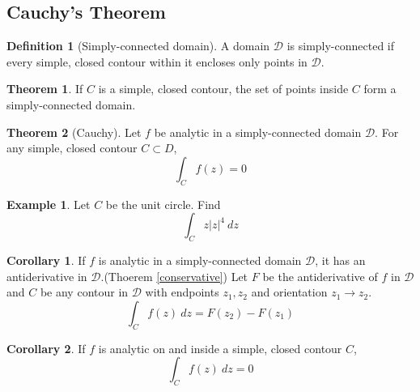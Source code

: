 \documentclass[10pt, a4paper]{extarticle}
\theoremstyle{definition}
\newtheorem{thm}{Theorem}
\newtheorem{cor}{Corollary}[thm]
\newtheorem{defn}{Definition}
\newtheorem{eg}{Example}
\begin{document}
\subsection{Cauchy's Theorem}
\begin{defn}[Simply-connected domain]
	A domain $\mathscr{D}$ is simply-connected if every simple, closed contour within it encloses only points in $\mathscr{D}$.
\end{defn}

\begin{thm}
	If $C$ is a simple, closed contour, the set of points inside $C$ form a simply-connected domain.
\end{thm}

\begin{thm}[Cauchy]
	Let $f$ be analytic in a simply-connected domain $\mathscr{D}$. For any simple, closed contour $C\subset D$,
	\[\int_Cf(z)=0\]
\end{thm}
\begin{eg}
	Let $C$ be the unit circle. Find
	\[\int_C z|z|^4\ dz\]
\end{eg}
\begin{cor}
	If $f$ is analytic in a simply-connected domain $\mathscr{D}$, it has an antiderivative in $\mathscr{D}$.(Thoerem \ref{conservative})
	Let $F$ be the antiderivative of $f$ in $\mathscr{D}$ and $C$ be any contour in $\mathscr{D}$ with endpoints $z_1,z_2$ and orientation $z_1\to z_2$.
	\[\int_Cf(z)\ dz=F(z_2)-F(z_1)\]
\end{cor}
\begin{cor}
	If $f$ is analytic on and inside a simple, closed contour $C$,
	\[\int_C f(z)\ dz=0\]
\end{cor}
\end{document}
